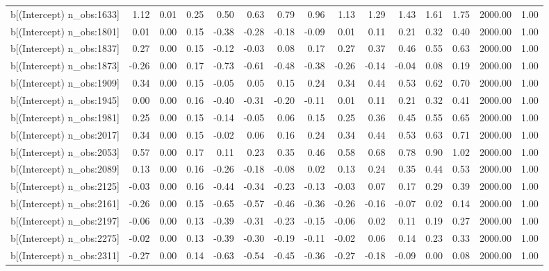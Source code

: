 \begin{table}[ht]
\begin{tabular}{rrrrrrrrrrrrrrr}
  b[(Intercept) n\_obs:1633] & 1.12 & 0.01 & 0.25 & 0.50 & 0.63 & 0.79 & 0.96 & 1.13 & 1.29 & 1.43 & 1.61 & 1.75 & 2000.00 & 1.00 \\ 
  b[(Intercept) n\_obs:1801] & 0.01 & 0.00 & 0.15 & -0.38 & -0.28 & -0.18 & -0.09 & 0.01 & 0.11 & 0.21 & 0.32 & 0.40 & 2000.00 & 1.00 \\ 
  b[(Intercept) n\_obs:1837] & 0.27 & 0.00 & 0.15 & -0.12 & -0.03 & 0.08 & 0.17 & 0.27 & 0.37 & 0.46 & 0.55 & 0.63 & 2000.00 & 1.00 \\ 
  b[(Intercept) n\_obs:1873] & -0.26 & 0.00 & 0.17 & -0.73 & -0.61 & -0.48 & -0.38 & -0.26 & -0.14 & -0.04 & 0.08 & 0.19 & 2000.00 & 1.00 \\ 
  b[(Intercept) n\_obs:1909] & 0.34 & 0.00 & 0.15 & -0.05 & 0.05 & 0.15 & 0.24 & 0.34 & 0.44 & 0.53 & 0.62 & 0.70 & 2000.00 & 1.00 \\ 
  b[(Intercept) n\_obs:1945] & 0.00 & 0.00 & 0.16 & -0.40 & -0.31 & -0.20 & -0.11 & 0.01 & 0.11 & 0.21 & 0.32 & 0.41 & 2000.00 & 1.00 \\ 
  b[(Intercept) n\_obs:1981] & 0.25 & 0.00 & 0.15 & -0.14 & -0.05 & 0.06 & 0.15 & 0.25 & 0.36 & 0.45 & 0.55 & 0.65 & 2000.00 & 1.00 \\ 
  b[(Intercept) n\_obs:2017] & 0.34 & 0.00 & 0.15 & -0.02 & 0.06 & 0.16 & 0.24 & 0.34 & 0.44 & 0.53 & 0.63 & 0.71 & 2000.00 & 1.00 \\ 
  b[(Intercept) n\_obs:2053] & 0.57 & 0.00 & 0.17 & 0.11 & 0.23 & 0.35 & 0.46 & 0.58 & 0.68 & 0.78 & 0.90 & 1.02 & 2000.00 & 1.00 \\ 
  b[(Intercept) n\_obs:2089] & 0.13 & 0.00 & 0.16 & -0.26 & -0.18 & -0.08 & 0.02 & 0.13 & 0.24 & 0.35 & 0.44 & 0.53 & 2000.00 & 1.00 \\ 
  b[(Intercept) n\_obs:2125] & -0.03 & 0.00 & 0.16 & -0.44 & -0.34 & -0.23 & -0.13 & -0.03 & 0.07 & 0.17 & 0.29 & 0.39 & 2000.00 & 1.00 \\ 
  b[(Intercept) n\_obs:2161] & -0.26 & 0.00 & 0.15 & -0.65 & -0.57 & -0.46 & -0.36 & -0.26 & -0.16 & -0.07 & 0.02 & 0.14 & 2000.00 & 1.00 \\ 
  b[(Intercept) n\_obs:2197] & -0.06 & 0.00 & 0.13 & -0.39 & -0.31 & -0.23 & -0.15 & -0.06 & 0.02 & 0.11 & 0.19 & 0.27 & 2000.00 & 1.00 \\ 
  b[(Intercept) n\_obs:2275] & -0.02 & 0.00 & 0.13 & -0.39 & -0.30 & -0.19 & -0.11 & -0.02 & 0.06 & 0.14 & 0.23 & 0.33 & 2000.00 & 1.00 \\ 
  b[(Intercept) n\_obs:2311] & -0.27 & 0.00 & 0.14 & -0.63 & -0.54 & -0.45 & -0.36 & -0.27 & -0.18 & -0.09 & 0.00 & 0.08 & 2000.00 & 1.00 \\ 

\end{tabular}
\end{table}

